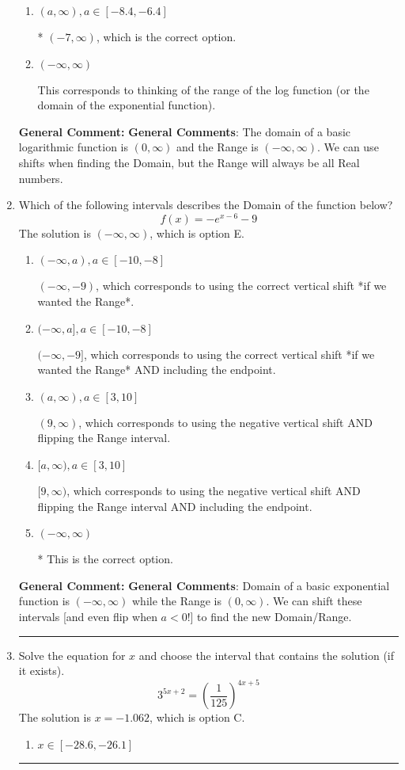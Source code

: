 \documentclass{extbook}[14pt]
\newcommand{\litem}[1]{\item #1

\rule{\textwidth}{0.4pt}}
\begin{document}
\begin{enumerate}
{\begin{enumerate}[label=\Alph*.]
$(-\infty, 7)$, which corresponds to flipping the Domain. Remember: the general for is $a*\log(x-h)+k$, \textbf{where $a$ does not affect the domain}.
\item \( (a, \infty), a \in [-8.4, -6.4] \)

* $(-7, \infty)$, which is the correct option.
\item \( (-\infty, \infty) \)

This corresponds to thinking of the range of the log function (or the domain of the exponential function).
\end{enumerate}

\textbf{General Comment:} \textbf{General Comments}: The domain of a basic logarithmic function is $(0, \infty)$ and the Range is $(-\infty, \infty)$. We can use shifts when finding the Domain, but the Range will always be all Real numbers.
}
\litem{
Which of the following intervals describes the Domain of the function below?
\[ f(x) = -e^{x-6}-9 \]The solution is \( (-\infty, \infty) \), which is option E.\begin{enumerate}[label=\Alph*.]
\item \( (-\infty, a), a \in [-10, -8] \)

$(-\infty, -9)$, which corresponds to using the correct vertical shift *if we wanted the Range*.
\item \( (-\infty, a], a \in [-10, -8] \)

$(-\infty, -9]$, which corresponds to using the correct vertical shift *if we wanted the Range* AND including the endpoint.
\item \( (a, \infty), a \in [3, 10] \)

$(9, \infty)$, which corresponds to using the negative vertical shift AND flipping the Range interval.
\item \( [a, \infty), a \in [3, 10] \)

$[9, \infty)$, which corresponds to using the negative vertical shift AND flipping the Range interval AND including the endpoint.
\item \( (-\infty, \infty) \)

* This is the correct option.
\end{enumerate}

\textbf{General Comment:} \textbf{General Comments}: Domain of a basic exponential function is $(-\infty, \infty)$ while the Range is $(0, \infty)$. We can shift these intervals [and even flip when $a<0$!] to find the new Domain/Range.
}
\litem{
Solve the equation for $x$ and choose the interval that contains the solution (if it exists).
\[ 3^{5x+2} = \left(\frac{1}{125}\right)^{4x+5} \]The solution is \( x = -1.062 \), which is option C.\begin{enumerate}[label=\Alph*.]
\item \( x \in [-28.6, -26.1] \)


\end{enumerate}}
\end{enumerate}
\end{document}

